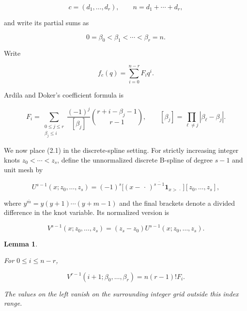 \documentclass[11pt]{article}
\newtheorem{lemma}[theorem]{Lemma}
\begin{document}
\[
c=(d_1,\ldots,d_r),\qquad n=d_1+\cdots+d_r,
\]

and write its partial sums as

\[
0=\beta_0<\beta_1<\cdots<\beta_r=n.
\]

Write

\[
f_c(q)=\sum_{i=0}^{n-r}F_iq^i.
\]

Ardila and Doker's coefficient formula is

\[
F_i=
\sum_{\substack{0\leq j\leq r\\ \beta_j\leq i}}
\frac{(-1)^j}{[\beta_j]}
\binom{r+i-\beta_j-1}{r-1},
\qquad
[\beta_j]=\prod_{\ell\ne j}|\beta_\ell-\beta_j|.
\tag{2.1}
\]

We now place (2.1) in the discrete-spline setting. For strictly increasing integer knots
$z_0<\cdots<z_s$, define the unnormalized discrete B-spline of degree $s-1$ and unit mesh by

\[
U^{s-1}(x;z_0,\ldots,z_s)
=(-1)^s
\bigl[(x-\,\cdot\,)^{\overline{s-1}}\mathbf 1_{x>\,\cdot\,}
\bigr][z_0,\ldots,z_s],
\tag{2.2}
\]

where $y^{\overline m}=y(y+1)\cdots(y+m-1)$ and the final brackets denote a divided difference in
the knot variable. Its normalized version is

\[
V^{s-1}(x;z_0,\ldots,z_s)
=(z_s-z_0)U^{s-1}(x;z_0,\ldots,z_s).
\tag{2.3}
\]

\Needspace{0.18\textheight}
\begin{lemma}
\label{lem:discrete-column}

For $0\leq i\leq n-r$,

\[
V^{r-1}(i+1;\beta_0,\ldots,\beta_r)=n(r-1)!F_i.
\tag{2.4}
\]

The values on the left vanish on the surrounding integer grid outside this index range.

\end{lemma}
\end{document}
